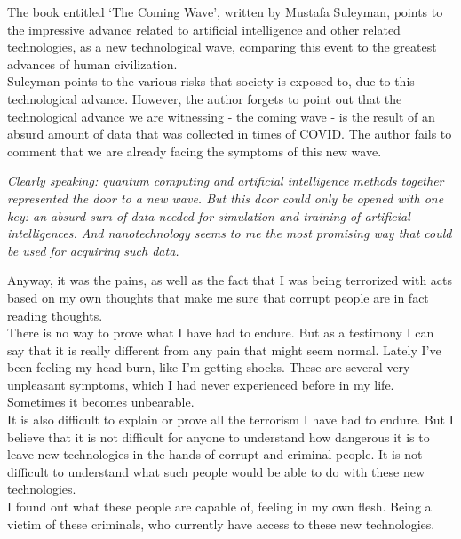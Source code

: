 \documentclass[11pt]{book}
\begin{document}
\noindent The book entitled ‘The Coming Wave', written by Mustafa Suleyman, points to the impressive advance related to artificial intelligence and other related technologies, as a new technological wave, comparing this event to the greatest advances of human civilization. \\

\noindent Suleyman points to the various risks that society is exposed to, due to this technological advance. However, the author forgets to point out that the technological advance we are witnessing - the coming wave - is the result of an absurd amount of data that was collected in times of COVID.  The author fails to comment that we are already facing the symptoms of this new wave.

\noindent \begin{center} \emph{Clearly speaking: quantum computing and artificial intelligence methods together represented the door to a new wave. But this door could only be opened with one key: an absurd sum of data needed for simulation and training of artificial intelligences. And nanotechnology seems to me the most promising way that could be used for acquiring such data.} \end{center}

\noindent Anyway, it was the pains, as well as the fact that I was being terrorized with acts based on my own thoughts that make me sure that corrupt people are in fact reading thoughts. \\

\noindent There is no way to prove what I have had to endure. But as a testimony I can say that it is really different from any pain that might seem normal. Lately I've been feeling my head burn, like I'm getting shocks. These are several very unpleasant symptoms, which I had never experienced before in my life. Sometimes it becomes unbearable. \\

\noindent It is also difficult to explain or prove all the terrorism I have had to endure. 
But I believe that it is not difficult for anyone to understand how dangerous it is to leave new technologies in the hands of corrupt and criminal people. It is not difficult to understand what such people would be able to do with these new technologies. \\

\noindent I found out what these people are capable of, feeling in my own flesh. Being a victim of these criminals, who currently have access to these new technologies. \\
\end{document}
